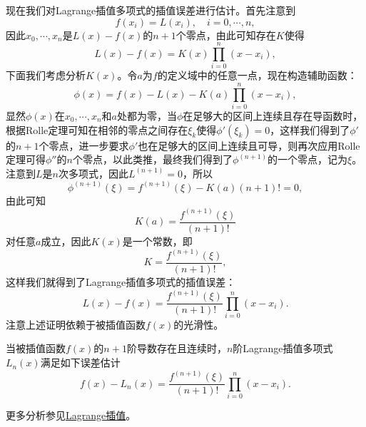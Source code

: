 \documentclass[a4paper,10pt]{ctexart}
\begin{document}
现在我们对Lagrange插值多项式的插值误差进行估计。首先注意到
\[
    f(x_i) = L(x_i),\quad i=0,\cdots,n,
\]
因此$ x_0,\cdots ,x_n $是$ L(x)-f(x) $的$ n+1 $个零点，由此可知存在$ K $使得
\begin{equation}
    L(x)-f(x)=K(x)\prod_{i=0}^{n}(x-x_i),
\end{equation}
下面我们考虑分析$ K(x) $。令$ a $为$ f $的定义域中的任意一点，现在构造辅助函数：
\begin{equation}
    \phi(x)=f(x)-L(x)-K(a)\prod_{i=0}^{n}(x-x_i),
\end{equation}
显然$ \phi(x) $在$ x_0,\cdots,x_n $和$ a $处都为零，当$ \phi $在足够大的区间上连续且存在导函数时，根据Rolle定理可知在相邻的零点之间存在$ \xi_k $使得$ \phi'(\xi_k)=0 $，这样我们得到了$ \phi' $的$ n+1 $个零点，进一步要求$ \phi' $也在足够大的区间上连续且可导，则再次应用Rolle定理可得$ \phi'' $的$ n $个零点，以此类推，最终我们得到了$ \phi^{(n+1)} $的一个零点，记为$ \xi $。注意到$ L $是$ n $次多项式，因此$ L^{(n+1)}=0 $，所以
\begin{equation}
    \phi^{(n+1)}(\xi)=f^{(n+1)}(\xi)-K(a)(n+1)!=0,
\end{equation}
由此可知
\begin{equation}
    K(a) = \frac{f^{(n+1)}(\xi)}{(n+1)!}
\end{equation}
对任意$ a $成立，因此$ K(x) $是一个常数，即
\begin{equation}
    K = \frac{f^{(n+1)}(\xi)}{(n+1)!},
\end{equation}
这样我们就得到了Lagrange插值多项式的插值误差：
\begin{equation}
    L(x)-f(x)=\frac{f^{(n+1)}(\xi)}{(n+1)!}\prod_{i=0}^{n}(x-x_i).
\end{equation}
注意上述证明依赖于被插值函数$ f(x) $的光滑性。

\begin{theorem}
    当被插值函数$ f(x) $的$ n+1 $阶导数存在且连续时，$ n $阶Lagrange插值多项式$ L_n(x) $满足如下误差估计
    \begin{equation}
        f(x)-L_n(x)=\frac{f^{(n+1)}(\xi)}{(n+1)!}\prod_{i=0}^{n}(x-x_i).
    \end{equation}
\end{theorem}

更多分析参见\href{http://staff.ustc.edu.cn/~rui/ppt/num/num-interpolation-lagrange.html}{Lagrange插值}。
\end{document}
